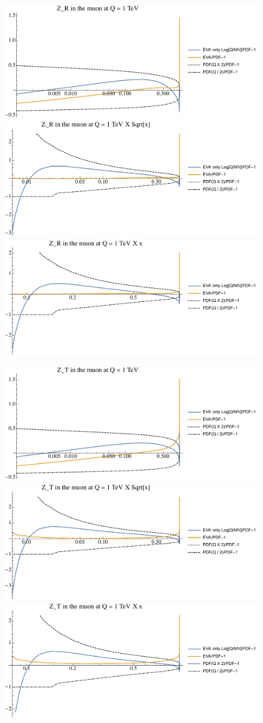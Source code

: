 \documentclass[a4paper,11pt]{article}
\begin{document}
\begin{figure}[ht]
\includegraphics[width=0.46\linewidth]{Notebooks/PlotPDFs/ratios/1TeV/Z_R_Q.pdf}
\includegraphics[width=0.46\linewidth]{Notebooks/PlotPDFs/ratios/1TeV/Z_R_Qsqrtx.pdf}
\includegraphics[width=0.46\linewidth]{Notebooks/PlotPDFs/ratios/1TeV/Z_R_Qx.pdf}
\end{figure}

\begin{figure}[ht]
\includegraphics[width=0.46\linewidth]{Notebooks/PlotPDFs/ratios/1TeV/Z_T_Q.pdf}
\includegraphics[width=0.46\linewidth]{Notebooks/PlotPDFs/ratios/1TeV/Z_T_Qsqrtx.pdf}
\includegraphics[width=0.46\linewidth]{Notebooks/PlotPDFs/ratios/1TeV/Z_T_Qx.pdf}
\end{figure}
\end{document}
